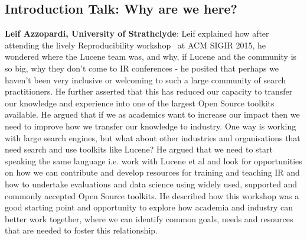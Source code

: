 \subsection*{Introduction Talk: Why are we here?}
{\bf Leif Azzopardi, University of Strathclyde}:
Leif explained how after attending the lively Reproducibility workshop~\cite{arguello2016repro} at ACM SIGIR 2015, he wondered where the Lucene team was, and why, if Lucene and the community is so big, why they don't come to IR conferences - he posited that perhaps we haven't been very inclusive or welcoming to such a large community of search practitioners. He further asserted that this has reduced our capacity to transfer our knowledge and experience into one of the largest Open Source toolkits available. He argued that if we as academics want to increase our impact then we need to improve how we transfer our knowledge to industry. One way is working with large search engines, but what about other industries and organisations that need search and use toolkits like Lucene? He argued that we need to start speaking the same language i.e. work with Lucene et al and look for opportunities on how we can contribute and develop resources for training and teaching IR and how to undertake evaluations and data science using widely used, supported and commonly accepted Open Source toolkits. He described how this workshop was a good starting point and opportunity to explore how academia and industry can better work together, where we can identify common goals, needs and resources that are needed to foster this relationship. 










